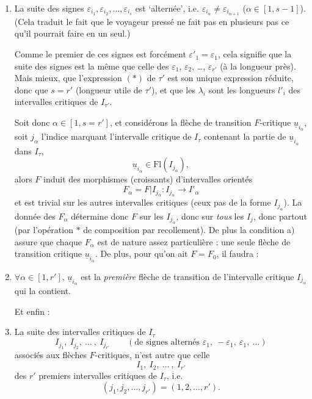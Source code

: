 \documentclass[11pt]{article}
\newcommand{\printedpage}[1]{\marginpar{\footnotesize p.~#1}}
\newcommand{\msp}[1]{\marginpar{\footnotesize [#1]}}
\newcommand{\ul}[1]{\underline{#1}}
\begin{document}
\begin{enumerate}[label={}, leftmargin=*]
\item[a)] La suite des signes $\varepsilon_{i_1},\varepsilon_{i_2},\dots,\varepsilon_{i_s}$ est ‘alternée’, i.e. $\varepsilon_{i_\alpha}\neq\varepsilon_{i_{\alpha+1}}$ ($\alpha\in[1,s-1]$). (Cela traduit le fait que le voyageur pressé ne fait pas en plusieurs pas ce qu'il pourrait faire en un seul.)

Comme le premier de ces signes est forcément $\varepsilon'_1=\varepsilon_1$, cela signifie que la suite des signes est la même que celle des $\varepsilon_1$, $\varepsilon_2$, \dots, $\varepsilon_{r'}$ (à la longueur près). Mais mieux, que l'expression $(*)$ de $\tau'$ est son unique expression réduite, donc que $s=r'$ (longueur utile de $\tau'$), et que les $\lambda_i$ sont les longueurs $l'_i$ des intervalles critiques de $I_{\tau'}$.

\printedpage{57}

\msp{page 88}
Soit donc $\alpha\in[1,s=r']$, et considérons la flèche de transition $F$-critique $\ul{u}_{i_\alpha}$, soit $j_\alpha$ l'indice marquant l'intervalle critique de $I_\tau$ contenant la partie de $\ul{u}_{i_\alpha}$ dans $I_\tau$,
\[
\ul{u}_{i_\alpha}\in\mathrm{Fl}(I_{j_\alpha}),
\]
alors $F$ induit des morphismes (croissants) d'intervalles orientés
\[
F_\alpha=F|I_{j_\alpha}:I_{j_\alpha}\longrightarrow I'_\alpha
\]
et est trivial sur les autres intervalles critiques (ceux pas de la forme $I_{j_\alpha}$). La donnée des $F_\alpha$ détermine donc $F$ sur les $I_{j_\alpha}$, donc sur \textit{tous} les $I_j$, donc partout (par l'opération $*$ de composition par recollement). De plus la condition a) assure que chaque $F_\alpha$ est de nature assez particulière : une seule flèche de transition critique $\ul{u}_{i_\alpha}$. De plus, pour qu'on ait $F=F_0$, il faudra :

\item[b)] $\forall\alpha\in[1,r']$, $\ul{u}_{i_\alpha}$ est la \textit{première} flèche de transition de l'intervalle critique $I_{j_\alpha}$ qui la contient.

Et enfin :

\item[c)] La suite des intervalles critiques de $I_\tau$
\[
I_{j_1},\ I_{j_2},\ \dots\ ,\ I_{j_{r'}}\qquad(\text{de signes alternés }\varepsilon_1,\ -\varepsilon_1,\ \varepsilon_1,\ \ldots)
\]
associés aux flèches $F$-critiques, n'est autre que celle
\[
I_1,\ I_2,\ \dots\ ,\ I_{r'}
\]
des $r'$ premiers intervalles critiques de $I_\tau$, i.e.
\[
(j_1,j_2,\dots,j_{r'})=(1,2,\dots,r').
\]
\end{enumerate}
\end{document}
